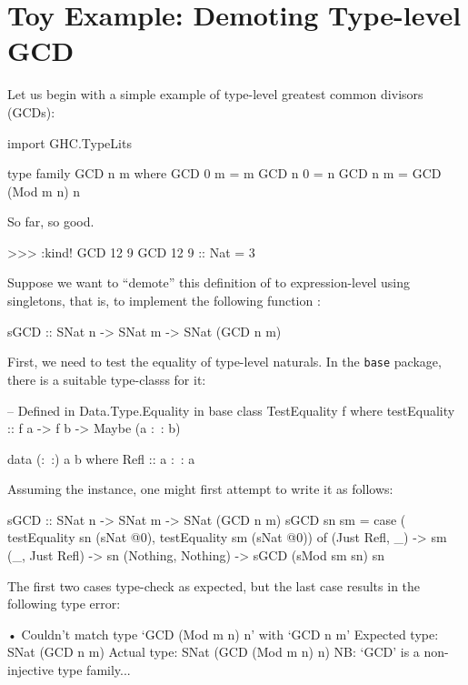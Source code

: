 \documentclass[demotion-paper.tex]{subfiles}
\begin{document}
\section{Toy Example: Demoting Type-level GCD}
\label{sec:gcd}
Let us begin with a simple example of type-level greatest common divisors (GCDs):

\begin{code}
import GHC.TypeLits

type family GCD n m where
  GCD 0 m = m
  GCD n 0 = n
  GCD n m = GCD (Mod m n) n
\end{code}

So far, so good.

\begin{repl}
>>> :kind! GCD 12 9
GCD 12 9 :: Nat
= 3
\end{repl}

Suppose we want to ``demote'' this definition of  to expression-level using singletons, that is, to implement the following function :

\begin{code}
sGCD :: SNat n -> SNat m -> SNat (GCD n m)
\end{code}

First, we need to test the equality of type-level naturals.
In the \texttt{base} package, there is a suitable type-classs for it:
\begin{code}
-- Defined in Data.Type.Equality in base
class TestEquality f where
  testEquality :: f a -> f b -> Maybe (a :~: b)

data (:~:) a b where Refl :: a :~: a
\end{code}
Assuming the  instance, one might first attempt to write it as follows:
\begin{code}
sGCD :: SNat n -> SNat m -> SNat (GCD n m)
sGCD sn sm =
  case ( testEquality sn (sNat @0), 
         testEquality sm (sNat @0)) of
    (Just Refl, _) -> sm
    (_, Just Refl) -> sn
    (Nothing, Nothing) -> sGCD (sMod sm sn) sn
\end{code}

The first two cases type-check as expected, but the last case results in the following type error:

\begin{repl}
• Couldn't match type ‘GCD (Mod m n) n’
  with ‘GCD n m’
  Expected type: SNat (GCD n m)
    Actual type: SNat (GCD (Mod m n) n)
  NB: ‘GCD’ is a non-injective type family...
\end{repl}
\end{document}
